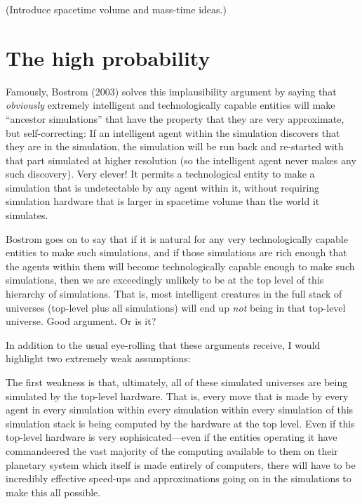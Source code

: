 \documentclass[12pt,letterpaper]{article}
\begin{document}
(Introduce spacetime volume and mass-time ideas.)

\section{The high probability}

Famously, Bostrom (2003) solves this implausibility argument by saying
that \emph{obviously} extremely intelligent and technologically
capable entities will make ``ancestor simulations'' that have the
property that they are very approximate, but self-correcting: If an
intelligent agent within the simulation discovers that they are in the
simulation, the simulation will be run back and re-started with that
part simulated at higher resolution (so the intelligent agent never
makes any such discovery). Very clever! It permits a technological entity
to make a simulation that is undetectable by any agent within it, without
requiring simulation hardware that is larger in spacetime volume than
the world it simulates.

Bostrom goes on to say that if it is natural for any very
technologically capable entities to make such simulations, and if
those simulations are rich enough that the agents within them will
become technologically capable enough to make such simulations, then
we are exceedingly unlikely to be at the top level of this hierarchy
of simulations. That is, most intelligent creatures in the full stack
of universes (top-level plus all simulations) will end up \emph{not}
being in that top-level universe. Good argument. Or is it?

In addition to the usual eye-rolling that these arguments receive, I
would highlight two extremely weak assumptions:

The first weakness is that, ultimately, all of these simulated
universes are being simulated by the top-level hardware. That is,
every move that is made by every agent in every simulation within
every simulation within every simulation of this simulation stack is
being computed by the hardware at the top level. Even if this
top-level hardware is very sophisicated---even if the entities
operating it have commandeered the vast majority of the computing
available to them on their planetary system which itself is made
entirely of computers, there will have to be incredibly effective
speed-ups and approximations going on in the simulations to make this
all possible.
\end{document}

